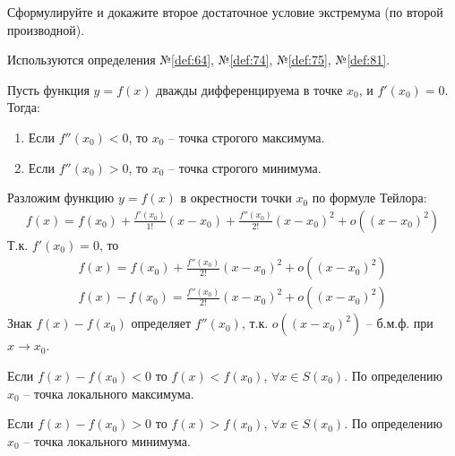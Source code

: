 \begin{question}
    Сформулируйте и докажите второе достаточное условие экстремума (по второй производной).
\end{question}
\begin{used}
    Используются определения №\ref{def:64}, №\ref{def:74}, №\ref{def:75}, №\ref{def:81}.
\end{used}
\begin{theorem}
    Пусть функция $y = f(x)$ дважды дифференцируема в точке $x_0$, и $f'(x_0) = 0$. Тогда:
    \begin{enumerate}
        \item Если $f''(x_0) < 0$, то $x_0$ -- точка строгого максимума. 
        \item Если $f''(x_0) > 0$, то $x_0$ -- точка строгого минимума. 
    \end{enumerate}
\end{theorem}
\begin{sufficiency}
    Разложим функцию $y = f(x)$ в окрестности точки $x_0$ по формуле Тейлора:
    \begin{gather*}
        f(x) = f(x_0) + \frac{f'(x_0)}{1!} (x - x_0) + \frac{f''(x_0)}{2!} (x - x_0)^2 + o((x - x_0)^{2})
    \end{gather*}
    Т.к. $f'(x_0) = 0$, то
    \begin{align*}
        f(x) = f(x_0) + \frac{f''(x_0)}{2!}(x - x_0)^2 + o((x - x_0)^2) \\
        f(x) - f(x_0) = \frac{f''(x_0)}{2!}(x - x_0)^2 + o((x - x_0)^2)
    \end{align*}
    Знак $f(x) - f(x_0)$ определяет $f''(x_0)$, т.к. $o((x - x_0)^2)$ -- б.м.ф. при $x \to  x_0$. 

    Если $f(x) - f(x_0) < 0$ то $f(x) < f(x_0)$, $\forall x \in  S(x_0)$.
    По определению $x_0$ -- точка локального максимума.

    Если $f(x) - f(x_0) > 0$ то $f(x) > f(x_0)$, $\forall x \in  S(x_0)$.
    По определению $x_0$ -- точка локального минимума.
\end{sufficiency}
\pagebreak



